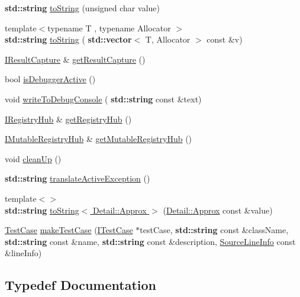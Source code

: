 \begin{DoxyCompactItemize}
\textbf{ std\+::string} \hyperlink{namespace_catch_a5d83eaeb68579a556c86cc05f7a7765f}{to\+String} (unsigned char value)
\item 
{\footnotesize template$<$typename T , typename Allocator $>$ }\\\textbf{ std\+::string} \hyperlink{namespace_catch_a2899237fef39daaae9a22e7846c0a9bf}{to\+String} (\textbf{ std\+::vector}$<$ T, Allocator $>$ const \&v)
\item 
\hyperlink{struct_catch_1_1_i_result_capture}{I\+Result\+Capture} \& \hyperlink{namespace_catch_aff60c1de6ac6cea30175d70e33d83c8e}{get\+Result\+Capture} ()
\item 
bool \hyperlink{namespace_catch_ab079497368fb1df25af39ad494d2a241}{is\+Debugger\+Active} ()
\item 
void \hyperlink{namespace_catch_aa5dcf4750ce9a854f4b74d3c952d13cc}{write\+To\+Debug\+Console} (\textbf{ std\+::string} const \&text)
\item 
\hyperlink{struct_catch_1_1_i_registry_hub}{I\+Registry\+Hub} \& \hyperlink{namespace_catch_ac24b072979540bfd922e7d46e899f46f}{get\+Registry\+Hub} ()
\item 
\hyperlink{struct_catch_1_1_i_mutable_registry_hub}{I\+Mutable\+Registry\+Hub} \& \hyperlink{namespace_catch_ac9ddcc6d66079add9cb2a3140b8ae51e}{get\+Mutable\+Registry\+Hub} ()
\item 
void \hyperlink{namespace_catch_a0f78e9afdebc6d4512d18e76fbf54b8c}{clean\+Up} ()
\item 
\textbf{ std\+::string} \hyperlink{namespace_catch_adafff91485eeeeb9e9333f317cc0e3b1}{translate\+Active\+Exception} ()
\item 
{\footnotesize template$<$$>$ }\\\textbf{ std\+::string} \hyperlink{namespace_catch_ac501c2b6bfe82978d699ddda37c53d13}{to\+String$<$ Detail\+::\+Approx $>$} (\hyperlink{class_catch_1_1_detail_1_1_approx}{Detail\+::\+Approx} const \&value)
\item 
\hyperlink{class_catch_1_1_test_case}{Test\+Case} \hyperlink{namespace_catch_a2a784590bb5068810d3f6013fed1f1d3}{make\+Test\+Case} (\hyperlink{struct_catch_1_1_i_test_case}{I\+Test\+Case} $\ast$test\+Case, \textbf{ std\+::string} const \&class\+Name, \textbf{ std\+::string} const \&name, \textbf{ std\+::string} const \&description, \hyperlink{struct_catch_1_1_source_line_info}{Source\+Line\+Info} const \&line\+Info)
\end{DoxyCompactItemize}


\subsection{Typedef Documentation}
\mbox{\label{namespace_catch_a14edb319150d3e108bbdef994f9eec2a}} 
